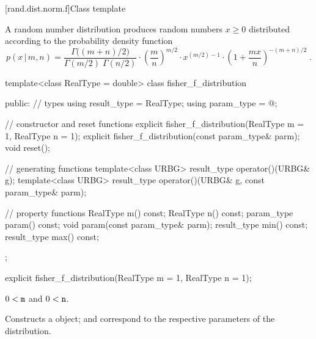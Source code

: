 
[rand.dist.norm.f]{Class template }%
%
%

\pnum
A  random number distribution
produces random numbers $x\ge0$
distributed according to
the probability density function%
%
%
\[%
 p(x\,|\,m,n)
      = \frac{\Gamma\big((m+n)/2\big)}
             {\Gamma(m/2) \; \Gamma(n/2)}
        \cdot
        \left(\frac{m}{n}\right)^{m/2}
        \cdot
        x^{(m/2)-1}
        \cdot
        {\left( 1 + \frac{m x}{n}  \right)}^{-(m+n)/2}
\; \mbox{.}
\]

%
\begin{codeblock}
template<class RealType = double>
  class fisher_f_distribution {
  public:
    // types
    using result_type = RealType;
    using param_type  = @\unspec@;

    // constructor and reset functions
    explicit fisher_f_distribution(RealType m = 1, RealType n = 1);
    explicit fisher_f_distribution(const param_type& parm);
    void reset();

    // generating functions
    template<class URBG>
      result_type operator()(URBG& g);
    template<class URBG>
      result_type operator()(URBG& g, const param_type& parm);

    // property functions
    RealType m() const;
    RealType n() const;
    param_type param() const;
    void param(const param_type& parm);
    result_type min() const;
    result_type max() const;
  };
\end{codeblock}


%
\begin{itemdecl}
explicit fisher_f_distribution(RealType m = 1, RealType n = 1);
\end{itemdecl}

\begin{itemdescr}
\pnum\requires
 $ 0 < \texttt{m} $ and $ 0 < \texttt{n} $.

\pnum\effects Constructs a  object;
  and 
 correspond to the respective parameters of the distribution.
\end{itemdescr}

